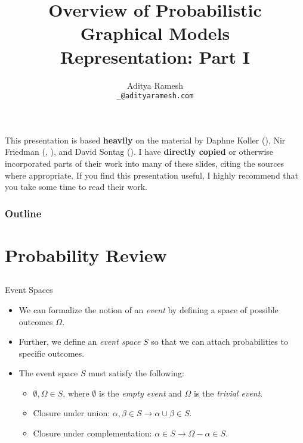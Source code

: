 \documentclass[11pt]{beamer}
\title[PGM Overview]{%
	Overview of Probabilistic Graphical Models\\
	Representation: Part I
}
\author[Aditya Ramesh]{%
	Aditya Ramesh \\
	\footnotesize\texttt{\_@adityaramesh.com}
}
\institute[University of Delaware]{%
	John Cavazos Lab\\
	University of Delaware\\
	Newark, Delaware 19716
}
\date{}
\begin{document}
\begin{frame}[plain]
\titlepage
\footnotesize
This presentation is based \textbf{heavily} on the material by Daphne Koller
(\cite{pgmbook}), Nir Friedman (\cite{pgmbook}, \cite{nirslides}), and David
Sontag (\cite{pgmslides}). I have \textbf{directly copied} or otherwise
incorporated parts of their work into many of these slides, citing the sources
where appropriate. If you find this presentation useful, I highly recommend that
you take some time to read their work.
\end{frame}

\begin{frame}
\frametitle{Outline}
\tableofcontents
\end{frame}

\section{Probability Review \cite{pgmbook}}
\subsection{}

\begin{frame}{Event Spaces}
\begin{itemize}
	\item We can formalize the notion of an \emph{event} by defining a space
	of possible outcomes $\Omega$.
	\item Further, we define an \emph{event space} $S$ so that we can attach
	probabilities to specific outcomes.
	\item The event space $S$ must satisfy the following:
	\begin{itemize}
		\item $\emptyset, \Omega \in S$, where $\emptyset$ is the
		\emph{empty event} and $\Omega$ is the \emph{trivial event}.
		\item Closure under union: $\alpha, \beta \in S \rightarrow
		\alpha \cup \beta \in S$.
		\item Closure under complementation: $\alpha \in S \rightarrow
		\Omega - \alpha \in S$.
	\end{itemize}
\end{itemize}
\end{frame}
\end{document}
